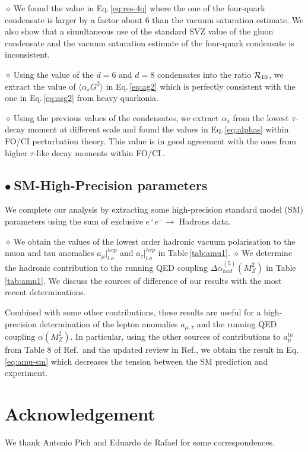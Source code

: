 \documentclass[review]{elsarticle}
\def\la{\langle}
\def\ra{\rangle}
\def\b{$\bullet~$}
\def\d{$\diamond~$}
\begin{document}
\d  We found the value in Eq.\,\ref{eq:res-4q} where the one of the four-quark condensate is larger by a factor about 6 than the vacuum saturation estimate. We also show that a simultaneous use of the standard SVZ value of the gluon condensate and the vacuum saturation estimate of the four-quark condensate is inconsistent. 

\d Using the value of the $d=6$ and $d=8$ condensates into the ratio ${\cal R}_{10}$, we extract the value of $\la\alpha_s G^2\ra$ in Eq.\,\ref{eq:ag2} which is perfectly consistent with the one in Eq.\,\ref{eq:asg2} from heavy quarkonia. 


\d Using the previous values of the condensates, we extract $\alpha_s$ from the lowest $\tau$-decay moment at different scale and found the values in Eq.\,\ref{eq:alphas} within FO/CI perturbation theory. This value is in good agreement with the ones from higher $\tau$-like decay moments within FO/CI\,\cite{PICH2}. 

\subsection*{\b SM-High-Precision parameters}
We complete our analysis by extracting some high-precision standard model (SM) parameters using the sum of exclusive $e^+e^-\to$ Hadrons data.

\d We obtain the values of the lowest order hadronic vacuum polarisation to the muon and tau anomalies $a_\mu\vert^{hvp}_{l.o}$ and $a_\tau\vert^{hvp}_{l.o}$ in Table\,\ref{tab:amu1}. 
\d We determine the hadronic contribution  to the running QED coupling $ \Delta \alpha_{had}^{(5)} (M_Z^2)$ in Table\,\ref{tab:amu1}. We discuss the sources of difference of our results with the most recent determinations.

Combined with some other contributions, these results are useful for a high-precision determination of the lepton anomalies $a_{\mu,\tau}$ and the running QED coupling $\alpha(M_Z^2)$.  In particular, using  the other sources of contributions to $a_\mu^{th}$ from Table 8 of Ref.\,\cite{KNECHT} and the updated review in Ref.\cite{GM2}, we obtain the result in Eq.\,\ref{eq:amu-sm} which decreases the tension between the SM prediction and experiment.  

\section*{Acknowledgement}
We thank %
Antonio Pich and  Eduardo de Rafael for some correspondences.
\newpage

\end{document}
